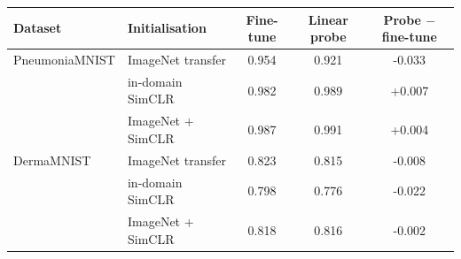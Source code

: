 \begin{tabular}{llccc}
\toprule
Dataset & Initialisation & Fine-tune & Linear probe & Probe $-$ fine-tune \\
\midrule
PneumoniaMNIST & ImageNet transfer & 0.954 & 0.921 & -0.033 \\
 & in-domain SimCLR & 0.982 & 0.989 & +0.007 \\
 & ImageNet + SimCLR & 0.987 & 0.991 & +0.004 \\
\midrule
DermaMNIST & ImageNet transfer & 0.823 & 0.815 & -0.008 \\
 & in-domain SimCLR & 0.798 & 0.776 & -0.022 \\
 & ImageNet + SimCLR & 0.818 & 0.816 & -0.002 \\
\bottomrule
\end{tabular}